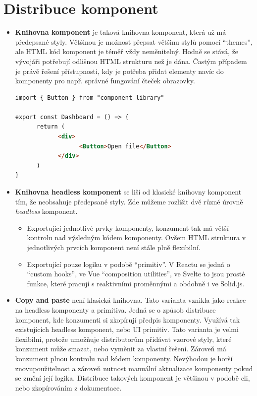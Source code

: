 \section{Distribuce komponent}

\begin{itemize}
      \item \textbf{Knihovna komponent} je taková knihovna komponent, která už má předepsané styly. Většinou je možnost přepsat většinu stylů pomocí ``themes'', ale HTML kód komponent je téměř vždy neměnitelný.
            Hodně se stává, že vývojáři potřebují odlišnou HTML strukturu než je dána.
            Častým případem je právě řešení přístupnosti, kdy je potřeba přidat elementy navíc do komponenty pro např. správné fungování čteček obrazovky.
            \begin{lstlisting}[caption={Ukázka použití komponentové knihovny}, label={component-distribution}, language=html]
import { Button } from "component-library"

export const Dashboard = () => {
      return (
            <div>
                  <Button>Open file</Button>
            </div>
      )
}
\end{lstlisting}
      \item \textbf{Knihovna headless komponent} se liší od klasické knihovny komponent tím, že neobsahuje předepsané styly.
            Zde můžeme rozlišit dvě různé úrovně \textit{headless} komponent.
            \begin{itemize}
                  \item Exportující jednotlivé prvky komponenty, konzument tak má větší kontrolu nad výsledným kódem komponenty.
                        Ovšem HTML struktura v jednotlivých prvcích komponent není stále plně flexibilní.
                  \item Exportující pouze logiku v podobě ``primitiv''. V Reactu se jedná o ``custom hooks'', ve Vue ``composition utilities'', ve Svelte to jsou prosté funkce, které pracují s reaktivními proměnnými a obdobně i ve Solid.js.
            \end{itemize}
      \item \textbf{Copy and paste} není klasická knihovna.
            Tato varianta vznikla jako reakce na headless komponenty a primitiva.
            Jedná se o způsob distribuce komponent, kde konzumenti si zkopírují předpis komponenty.
            Využívá tak existujících headless komponent, nebo UI primitiv.
            Tato varianta je velmi flexibilní, protože umožňuje distributorům přidávat vzorové styly, které konzument může smazat, nebo vyměnit za vlastní řešení.
            Zároveň má konzument plnou kontrolu nad kódem komponenty.
            Nevýhodou je horší znovupoužitelnost a zároveň nutnost manuální aktualizace komponenty pokud se změní její logika.
            Distribuce takových komponent je většinou v podobě \gls{cli}, nebo zkopírováním z dokumentace.
\end{itemize}

